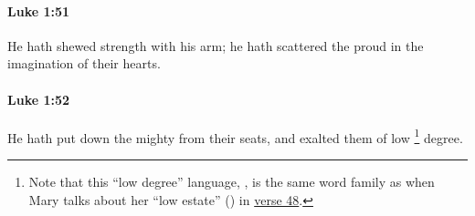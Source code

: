		\paragraph{Luke 1:51} %
			\label{LUKE-1-51}

			He hath shewed strength with his arm; he hath scattered the proud in the imagination of their hearts.

			\begin{framed}
			\scriptsize
				\begin{compactdesc}
					\item[SBLG] 
				\end{compactdesc}
			\end{framed}

		\paragraph{Luke 1:52} %
			\label{LUKE-1-52}

			He hath put down the mighty from their seats, and exalted them of low%
				\footnote{%
					Note that this ``low degree'' language, , is the same word family as when Mary talks about her ``low estate'' () in \hyperref[LUKE-1-48]{verse 48}.
					}
			degree.


